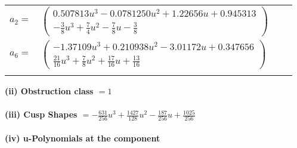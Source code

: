 \documentclass[1p]{elsarticle_modified}
\theoremstyle{definition}
\begin{document}
\begin{tabular}{m{7pt} m{180pt} m{7pt} m{180pt} }
\flushright $a_{2}=$&$\begin{pmatrix}0.507813 u^{3}-0.0781250 u^{2}+1.22656 u+0.945313\\-\frac{3}{8} u^3+\frac{7}{4} u^2-\frac{7}{8} u-\frac{3}{8}\end{pmatrix}$ \\
\flushright $a_{6}=$&$\begin{pmatrix}-1.37109 u^{3}+0.210938 u^{2}-3.01172 u+0.347656\\\frac{21}{16} u^3+\frac{7}{8} u^2+\frac{17}{16} u+\frac{13}{16}\end{pmatrix}$\\&\end{tabular}
\flushleft \textbf{(ii) Obstruction class $= 1$}\\~\\
\flushleft \textbf{(iii) Cusp Shapes $= -\frac{631}{256} u^3+\frac{1427}{128} u^2-\frac{187}{256} u+\frac{1025}{256}$}\\~\\
\newpage\renewcommand{\arraystretch}{1}
\flushleft \textbf{(iv) u-Polynomials at the component}\newline \\
\end{document}
